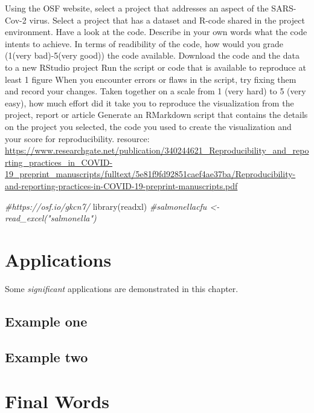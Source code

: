 \documentclass[
]{book}
\newenvironment{Shaded}{\begin{snugshade}}{\end{snugshade}}
\newcommand{\CommentTok}[1]{\textcolor[rgb]{0.56,0.35,0.01}{\textit{#1}}}
\newcommand{\FunctionTok}[1]{\textcolor[rgb]{0.00,0.00,0.00}{#1}}
\newcommand{\NormalTok}[1]{#1}
\begin{document}
Using the OSF website, select a project that addresses an aspect of the SARS-Cov-2 virus.
Select a project that has a dataset and R-code shared in the project environment.
Have a look at the code. Describe in your own words what the code intents to achieve.
In terms of readibility of the code, how would you grade (1(very bad)-5(very good)) the code available.
Download the code and the data to a new RStudio project
Run the script or code that is available to reproduce at least 1 figure
When you encounter errors or flaws in the script, try fixing them and record your changes.
Taken together on a scale from 1 (very hard) to 5 (very easy), how much effort did it take you to reproduce the visualization from the project, report or article
Generate an RMarkdown script that contains the details on the project you selected, the code you used to create the visualization and your score for reproducibility.
resource: \url{https://www.researchgate.net/publication/340244621_Reproducibility_and_reporting_practices_in_COVID-19_preprint_manuscripts/fulltext/5e81f9fd92851caef4ae37ba/Reproducibility-and-reporting-practices-in-COVID-19-preprint-manuscripts.pdf}

\begin{Shaded}
\begin{Highlighting}[]
\CommentTok{\#https://osf.io/gkcn7/}
\FunctionTok{library}\NormalTok{(readxl)}
\CommentTok{\#salmonellacfu \textless{}{-} read\_excel("salmonella")}
\end{Highlighting}
\end{Shaded}

\hypertarget{applications}{%
\chapter{Applications}\label{applications}}

Some \emph{significant} applications are demonstrated in this chapter.

\hypertarget{example-one}{%
\section{Example one}\label{example-one}}

\hypertarget{example-two}{%
\section{Example two}\label{example-two}}

\hypertarget{final-words}{%
\chapter{Final Words}\label{final-words}}
\end{document}
